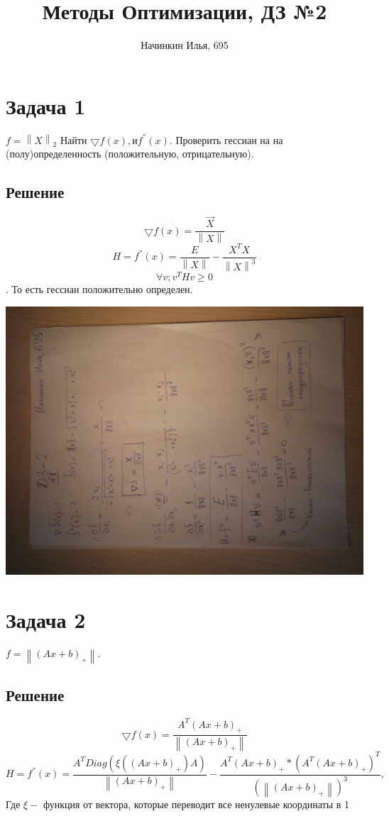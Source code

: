 \documentclass[a4paper]{article}
\title{Методы Оптимизации, ДЗ №2}
\author{Начинкин Илья, 695}
\newcommand{\norm}[1]{\left\lVert#1\right\rVert}
\begin{document}
\maketitle


\section*{Задача 1} 
$f = \norm X _{2}$ Найти $\bigtriangledown{f}(x), и f^{''}(x)$. Проверить гессиан на  на (полу)определенность (положительную, отрицательную).
\subsection*{Решение}

$$\bigtriangledown{f}(x) = \frac{\vec{X}}{\norm X}$$
$$H = f^{''}(x) = \frac{E}{\norm X} - \frac{X^{T}X}{\norm X ^{3}}$$
$$\forall{v} ; v^{T}Hv \geq 0$$. То есть гессиан положительно определен.

\includegraphics[scale=0.3, angle=270]{one}

\section*{Задача 2}
$f = \norm{(Ax + b)_{+}}$.
\subsection*{Решение}
$$\bigtriangledown{f}(x) = \frac{A^{T}(Ax + b)_{+}}{\norm{(Ax + b)_{+}}} $$
\begin{equation*}
H = f^{''}(x) = \frac{A^{T}Diag(\xi((Ax + b)_{+})A)}{\norm{(Ax + b)_{+}}} - 
\frac{A^{T}(Ax + b)_{+}*(A^{T}(Ax + b)_{+})^{T}}{(\norm{(Ax + b)_{+}})^{3}},
\end{equation*}
 Где $\xi -$ функция от вектора, которые переводит все ненулевые координаты в 1
\end{document}
